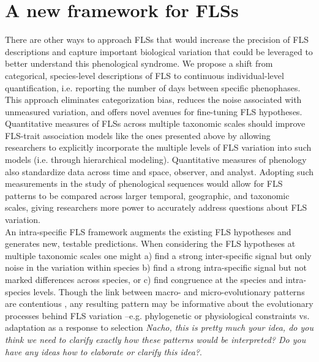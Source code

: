\documentclass{article}
\begin{document}
\section*{A new framework for FLSs} %

\noindent There are other ways to approach FLSs that would increase the precision of FLS descriptions and capture important biological variation that could be leveraged to better understand this phenological syndrome. We propose a shift from categorical, species-level descriptions of FLS to continuous individual-level quantification, i.e. reporting the number of days between specific phenophases. This approach eliminates categorization bias, reduces the noise associated with unmeasured variation, and offers novel avenues for fine-tuning FLS hypotheses.\\ 

\noindent  Quantitative measures of FLSs across multiple taxonomic scales should improve FLS-trait association models like the ones presented above by allowing researchers to explicitly incorporate the multiple levels of FLS variation into such models (i.e. through hierarchical modeling). Quantitative measures of phenology \citep[e.g. the BBCH scale,][]{Finn2007} also standardize data across time and space, observer, and analyst. Adopting such measurements in the study of phenological sequences would allow for FLS patterns to be compared across larger temporal, geographic, and taxonomic scales, giving researchers more power to accurately address questions about FLS variation.\\

\noindent An intra-specific FLS framework augments the existing FLS hypotheses and generates new, testable predictions. When considering the FLS hypotheses at multiple taxonomic scales one might a) find a strong inter-specific signal but only noise in the variation within species b) find a strong intra-specific signal but not marked differences across species, or c) find congruence at the species and intra-species levels. Though the link between macro- and micro-evolutionary patterns are contentious \citep{Violle2012,Shipley2016}, any resulting pattern may be informative about the evolutionary processes behind FLS variation --e.g. phylogenetic or physiological constraints  vs. adaptation as a response to selection \emph{Nacho, this is pretty much your idea, do you think we need to clarify exactly how these patterns would be interpreted? Do you have any ideas how to elaborate or clarify this idea?}.\\
\end{document}
